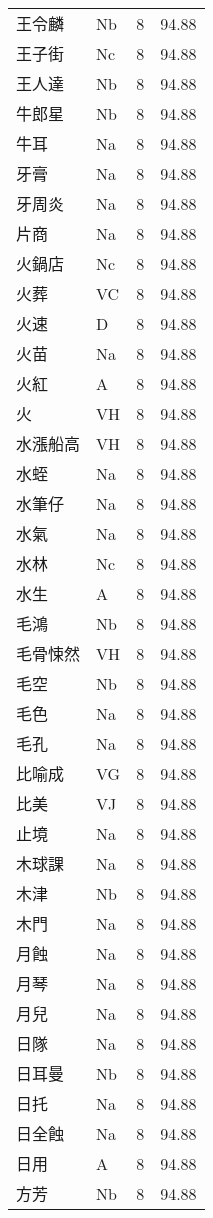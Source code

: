 \documentclass[twocolumn]{book}
\begin{document}
\begin{supertabular}{llrr}
王令麟 & Nb & 8 &  94.88\\
王子街 & Nc & 8 &  94.88\\
王人達 & Nb & 8 &  94.88\\
牛郎星 & Nb & 8 &  94.88\\
牛耳 & Na & 8 &  94.88\\
牙膏 & Na & 8 &  94.88\\
牙周炎 & Na & 8 &  94.88\\
片商 & Na & 8 &  94.88\\
火鍋店 & Nc & 8 &  94.88\\
火葬 & VC & 8 &  94.88\\
火速 & D & 8 &  94.88\\
火苗 & Na & 8 &  94.88\\
火紅 & A & 8 &  94.88\\
火 & VH & 8 &  94.88\\
水漲船高 & VH & 8 &  94.88\\
水蛭 & Na & 8 &  94.88\\
水筆仔 & Na & 8 &  94.88\\
水氣 & Na & 8 &  94.88\\
水林 & Nc & 8 &  94.88\\
水生 & A & 8 &  94.88\\
毛鴻 & Nb & 8 &  94.88\\
毛骨悚然 & VH & 8 &  94.88\\
毛空 & Nb & 8 &  94.88\\
毛色 & Na & 8 &  94.88\\
毛孔 & Na & 8 &  94.88\\
比喻成 & VG & 8 &  94.88\\
比美 & VJ & 8 &  94.88\\
止境 & Na & 8 &  94.88\\
木球課 & Na & 8 &  94.88\\
木津 & Nb & 8 &  94.88\\
木門 & Na & 8 &  94.88\\
月蝕 & Na & 8 &  94.88\\
月琴 & Na & 8 &  94.88\\
月兒 & Na & 8 &  94.88\\
日隊 & Na & 8 &  94.88\\
日耳曼 & Nb & 8 &  94.88\\
日托 & Na & 8 &  94.88\\
日全蝕 & Na & 8 &  94.88\\
日用 & A & 8 &  94.88\\
方芳 & Nb & 8 &  94.88\\

\end{supertabular}
\end{document}
